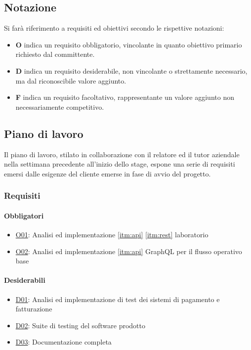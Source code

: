 \subsection{Notazione}
Si farà riferimento a requisiti ed obiettivi secondo le rispettive notazioni:
\begin{itemize}
    \item \textbf{O} indica un requisito obbligatorio, vincolante in quanto obiettivo primario richiesto dal committente.
    \item \textbf{D} indica un requisito desiderabile, non vincolante o strettamente necessario, ma dal riconoscibile valore aggiunto.
    \item \textbf{F} indica un requisito facoltativo, rappresentante un valore aggiunto non necessariamente competitivo.
\end{itemize}
\subsection{Piano di lavoro}
Il piano di lavoro, stilato in collaborazione con il relatore ed il tutor aziendale nella settimana precedente all'inizio dello stage, espone una serie di requisiti emersi dalle esigenze del cliente emerse in fase di avvio del progetto.
\subsubsection{Requisiti}
\paragraph{Obbligatori}
\begin{itemize}
    \item \underline{O01}: Analisi ed implementazione \ref{itm:api} \ref{itm:rest} laboratorio
    \item \underline{O02}: Analisi ed implementazione \ref{itm:api} GraphQL per il flusso operativo base
\end{itemize}
\vspace{-15pt}
\paragraph{Desiderabili}
\begin{itemize}
    \item \underline{D01}: Analisi ed implementazione di test dei sistemi di pagamento e fatturazione
    \item \underline{D02}: Suite di testing del software prodotto
    \item \underline{D03}: Documentazione completa
\end{itemize}
\vspace{-15pt}
